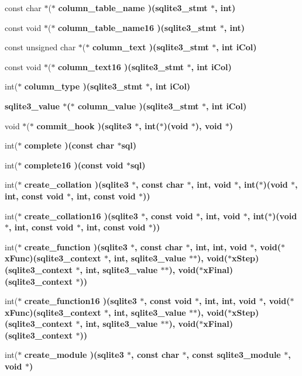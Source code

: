 \begin{CompactItemize}
\item 
const char $\ast$($\ast$ \bf{column\_\-table\_\-name} )(\bf{sqlite3\_\-stmt} $\ast$, int)
\item 
const void $\ast$($\ast$ \bf{column\_\-table\_\-name16} )(\bf{sqlite3\_\-stmt} $\ast$, int)
\item 
const unsigned char $\ast$($\ast$ \bf{column\_\-text} )(\bf{sqlite3\_\-stmt} $\ast$, int i\-Col)
\item 
const void $\ast$($\ast$ \bf{column\_\-text16} )(\bf{sqlite3\_\-stmt} $\ast$, int i\-Col)
\item 
int($\ast$ \bf{column\_\-type} )(\bf{sqlite3\_\-stmt} $\ast$, int i\-Col)
\item 
\bf{sqlite3\_\-value} $\ast$($\ast$ \bf{column\_\-value} )(\bf{sqlite3\_\-stmt} $\ast$, int i\-Col)
\item 
void $\ast$($\ast$ \bf{commit\_\-hook} )(\bf{sqlite3} $\ast$, int($\ast$)(void $\ast$), void $\ast$)
\item 
int($\ast$ \bf{complete} )(const char $\ast$\bf{sql})
\item 
int($\ast$ \bf{complete16} )(const void $\ast$\bf{sql})
\item 
int($\ast$ \bf{create\_\-collation} )(\bf{sqlite3} $\ast$, const char $\ast$, int, void $\ast$, int($\ast$)(void $\ast$, int, const void $\ast$, int, const void $\ast$))
\item 
int($\ast$ \bf{create\_\-collation16} )(\bf{sqlite3} $\ast$, const void $\ast$, int, void $\ast$, int($\ast$)(void $\ast$, int, const void $\ast$, int, const void $\ast$))
\item 
int($\ast$ \bf{create\_\-function} )(\bf{sqlite3} $\ast$, const char $\ast$, int, int, void $\ast$, void($\ast$x\-Func)(\bf{sqlite3\_\-context} $\ast$, int, \bf{sqlite3\_\-value} $\ast$$\ast$), void($\ast$x\-Step)(\bf{sqlite3\_\-context} $\ast$, int, \bf{sqlite3\_\-value} $\ast$$\ast$), void($\ast$x\-Final)(\bf{sqlite3\_\-context} $\ast$))
\item 
int($\ast$ \bf{create\_\-function16} )(\bf{sqlite3} $\ast$, const void $\ast$, int, int, void $\ast$, void($\ast$x\-Func)(\bf{sqlite3\_\-context} $\ast$, int, \bf{sqlite3\_\-value} $\ast$$\ast$), void($\ast$x\-Step)(\bf{sqlite3\_\-context} $\ast$, int, \bf{sqlite3\_\-value} $\ast$$\ast$), void($\ast$x\-Final)(\bf{sqlite3\_\-context} $\ast$))
\item 
int($\ast$ \bf{create\_\-module} )(\bf{sqlite3} $\ast$, const char $\ast$, const \bf{sqlite3\_\-module} $\ast$, void $\ast$)
\item 

\end{CompactItemize}
